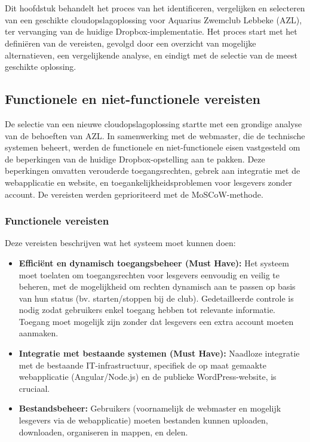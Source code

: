 \chapter{}
\label{ch:vergelijking}
Dit hoofdstuk behandelt het proces van het identificeren, vergelijken en selecteren van een geschikte cloudopslagoplossing voor Aquarius Zwemclub Lebbeke (AZL), ter vervanging van de huidige Dropbox-implementatie. Het proces start met het definiëren van de vereisten, gevolgd door een overzicht van mogelijke alternatieven, een vergelijkende analyse, en eindigt met de selectie van de meest geschikte oplossing.
\section{Functionele en niet-functionele vereisten}
De selectie van een nieuwe cloudopslagoplossing startte met een grondige analyse van de behoeften van AZL. 
In samenwerking met de webmaster, die de technische systemen beheert, werden de functionele en niet-functionele 
eisen vastgesteld om de beperkingen van de huidige Dropbox-opstelling aan te pakken. 
Deze beperkingen omvatten verouderde toegangsrechten, gebrek aan integratie met de webapplicatie en website, 
en toegankelijkheidsproblemen voor lesgevers zonder account. De vereisten werden geprioriteerd met de MoSCoW-methode.

\subsection{Functionele vereisten}
Deze vereisten beschrijven wat het systeem moet kunnen doen:
\begin{itemize}
    \item \textbf{Efficiënt en dynamisch toegangsbeheer (Must Have):} Het systeem moet toelaten om toegangsrechten voor lesgevers eenvoudig en veilig te beheren, met de mogelijkheid om rechten dynamisch aan te passen op basis van hun status (bv. starten/stoppen bij de club). Gedetailleerde controle is nodig zodat gebruikers enkel toegang hebben tot relevante informatie. Toegang moet mogelijk zijn zonder dat lesgevers een extra account moeten aanmaken.
    \item \textbf{Integratie met bestaande systemen (Must Have):} Naadloze integratie met de bestaande IT-infrastructuur, specifiek de op maat gemaakte webapplicatie (Angular/Node.js) en de publieke WordPress-website, is cruciaal.
    \item \textbf{Bestandsbeheer:} Gebruikers (voornamelijk de webmaster en mogelijk lesgevers via de webapplicatie) moeten bestanden kunnen uploaden, downloaden, organiseren in mappen, en delen.
\end{itemize}

